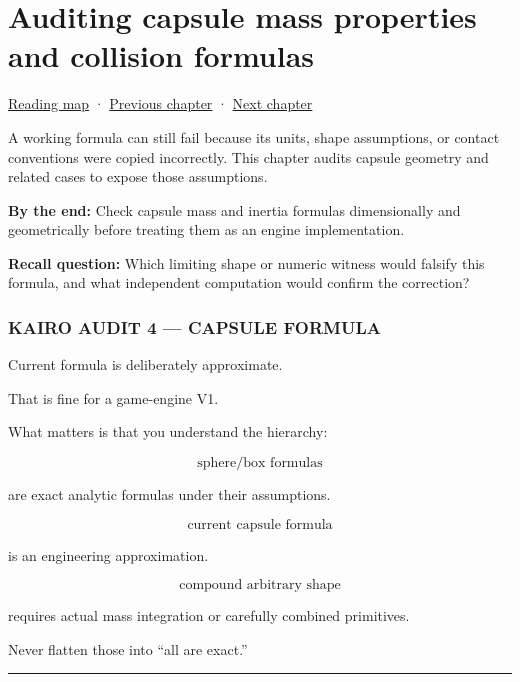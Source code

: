 \chapter{Auditing capsule mass properties and collision formulas}\label{06-engine-ii-ch036-auditing-capsule-mass-properties-and-collision-formulas}\hypertarget{06-engine-ii-ch036}{}\label{stagechapter:06-engine-ii-ch036}

\hyperref[volume-reading-map]{Reading map} · \hyperref[06-engine-ii-ch035-a-complete-rigid-body-state-before-the-formula-audit]{Previous chapter} · \hyperref[06-engine-ii-ch037-physical-examples-and-state-validation]{Next chapter}

A working formula can still fail because its units, shape assumptions, or contact conventions were copied incorrectly. This chapter audits capsule geometry and related cases to expose those assumptions.

\textbf{By the end:} Check capsule mass and inertia formulas dimensionally and geometrically before treating them as an engine implementation.

\textbf{Recall question:} Which limiting shape or numeric witness would falsify this formula, and what independent computation would confirm the correction?

\subsection{KAIRO AUDIT 4 --- CAPSULE FORMULA}\label{06-engine-ii-ch036-kairo-audit-4-capsule-formula}

Current formula is deliberately approximate.

That is fine for a game-engine V1.

What matters is that you understand the hierarchy:

\[
\text{sphere/box formulas}
\]

are exact analytic formulas under their assumptions.

\[
\text{current capsule formula}
\]

is an engineering approximation.

\[
\text{compound arbitrary shape}
\]

requires actual mass integration or carefully combined primitives.

Never flatten those into ``all are exact.''

\begin{center}\rule{0.5\linewidth}{0.5pt}\end{center}

